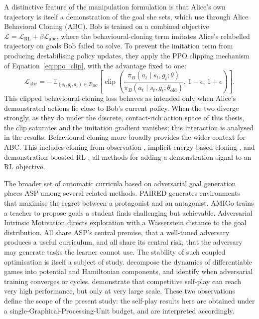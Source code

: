 A distinctive feature of the manipulation formulation is that Alice's own
trajectory is itself a demonstration of the goal she sets, which
\cite{OpenAI2021AsymmetricSF} use through Alice Behavioral Cloning (ABC). Bob
is trained on a combined objective $\mathcal{L} = \mathcal{L}_{\text{RL}} + \beta
\mathcal{L}_{\text{abc}}$, where the behavioural-cloning term imitates Alice's
relabelled trajectory on goals Bob failed to solve. To prevent the imitation term
from producing destabilising policy updates, they apply the PPO clipping mechanism
of Equation~\ref{eq:ppo_clip}, with the advantage fixed to one:
\begin{equation}
    \mathcal{L}_{\text{abc}} = -\,\mathbb{E}_{(s_t, g_t, a_t) \in \mathcal{D}_{\text{BC}}}\!\left[ \operatorname{clip}\!\left( \frac{\pi_B(a_t \mid s_t, g_t; \theta)}{\pi_B(a_t \mid s_t, g_t; \theta_{\text{old}})},\, 1 - \epsilon,\, 1 + \epsilon \right) \right].
    \label{eq:abc}
\end{equation}
This clipped behavioural-cloning loss behaves as intended only when Alice's
demonstrated actions lie close to Bob's current policy. When the two diverge
strongly, as they do under the discrete, contact-rich action space of this thesis,
the clip saturates and the imitation gradient vanishes; this interaction is
analysed in the results. Behavioural cloning more broadly provides the wider
context for ABC. This includes cloning from observation \cite{Torabi2018BCO},
implicit energy-based cloning \cite{Florence2022ImplicitBC}, and
demonstration-boosted RL \cite{Hester2017DeepQF, Silver2018ResidualPolicy}, all
methods for adding a demonstration signal to an RL objective.

The broader set of automatic curricula based on adversarial goal generation
places ASP among several related methods. PAIRED \cite{Dennis2020PAIRED} generates
environments that maximise the regret between a protagonist and an antagonist.
AMIGo \cite{Campero2021AMIGo} trains a teacher to propose goals a student finds
challenging but achievable. Adversarial Intrinsic Motivation
\cite{Durugkar2021AIM} directs exploration with a Wasserstein distance to the goal
distribution. All share ASP's central premise, that a well-tuned adversary
produces a useful curriculum, and all share its central risk, that the adversary
may generate tasks the learner cannot use. The stability of such coupled
optimisation is itself a subject of study. \cite{Letcher2019GameMechanics}
decompose the dynamics of differentiable games into potential and Hamiltonian
components, and identify when adversarial training converges or cycles.
\cite{Berner2019Dota2} demonstrate that competitive self-play can reach very high
performance, but only at very large scale. These two observations define the
scope of the present study: the self-play results here are obtained under a
single-Graphical-Processing-Unit budget, and are interpreted accordingly.

